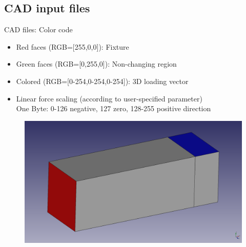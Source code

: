 \subsection{CAD input files}
\begin{frame}{CAD files: Color code}

\begin{itemize}
\item Red faces (RGB=[255,0,0]): Fixture
\item Green faces (RGB=[0,255,0]): Non-changing region  
\item Colored (RGB=[0-254,0-254,0-254]): 3D loading vector 
\item Linear force scaling (according to user-specified parameter)\\
One Byte: 0-126 negative, 127 zero, 128-255 positive direction
\end{itemize}
\begin{figure}
\centering
\includegraphics[width=.5\textwidth]{Pictures/CantileverColored.png}
\end{figure}
\end{frame}

